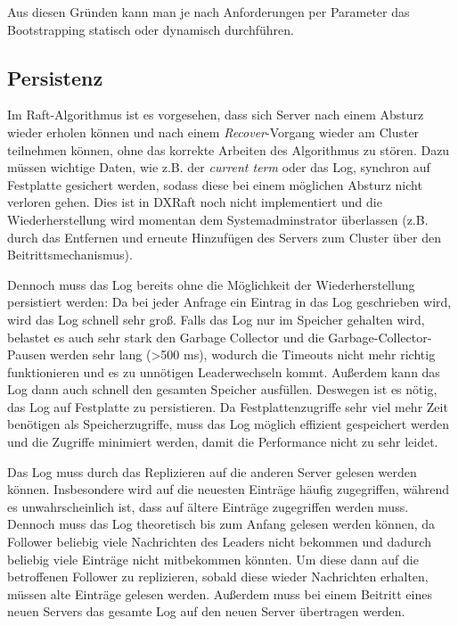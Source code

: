 Aus diesen Gründen kann man je nach Anforderungen per Parameter das Bootstrapping statisch oder dynamisch durchführen.

\subsection{Persistenz}

Im Raft-Algorithmus ist es vorgesehen, dass sich Server nach einem Absturz wieder erholen können und nach einem \textit{Recover}-Vorgang wieder am Cluster teilnehmen können, ohne das korrekte Arbeiten des Algorithmus zu stören. Dazu müssen wichtige Daten, wie z.B. der \textit{current term} oder das Log, synchron auf Festplatte gesichert werden, sodass diese bei einem möglichen Absturz nicht verloren gehen. Dies ist in DXRaft noch nicht implementiert und die Wiederherstellung wird momentan dem Systemadminstrator überlassen (z.B. durch das Entfernen und erneute Hinzufügen des Servers zum Cluster über den Beitrittsmechanismus).

Dennoch muss das Log bereits ohne die Möglichkeit der Wiederherstellung persistiert werden: Da bei jeder Anfrage ein Eintrag in das Log geschrieben wird, wird das Log schnell sehr groß. Falls das Log nur im Speicher gehalten wird, belastet es auch sehr stark den Garbage Collector und die Garbage-Collector-Pausen werden sehr lang (\textgreater 500 ms), wodurch die Timeouts nicht mehr richtig funktionieren und es zu unnötigen Leaderwechseln kommt. Außerdem kann das Log dann auch schnell den gesamten Speicher ausfüllen. Deswegen ist es nötig, das Log auf Festplatte zu persistieren. Da Festplattenzugriffe sehr viel mehr Zeit benötigen als Speicherzugriffe, muss das Log möglich effizient gespeichert werden und die Zugriffe minimiert werden, damit die Performance nicht zu sehr leidet.

Das Log muss durch das Replizieren auf die anderen Server gelesen werden können. Insbesondere wird auf die neuesten Einträge häufig zugegriffen, während es unwahrscheinlich ist, dass auf ältere Einträge zugegriffen werden muss. Dennoch muss das Log theoretisch bis zum Anfang gelesen werden können, da Follower beliebig viele Nachrichten des Leaders nicht bekommen und dadurch beliebig viele Einträge nicht mitbekommen könnten. Um diese dann auf die betroffenen Follower zu replizieren, sobald diese wieder Nachrichten erhalten, müssen alte Einträge gelesen werden. Außerdem muss bei einem Beitritt eines neuen Servers das gesamte Log auf den neuen Server übertragen werden.

